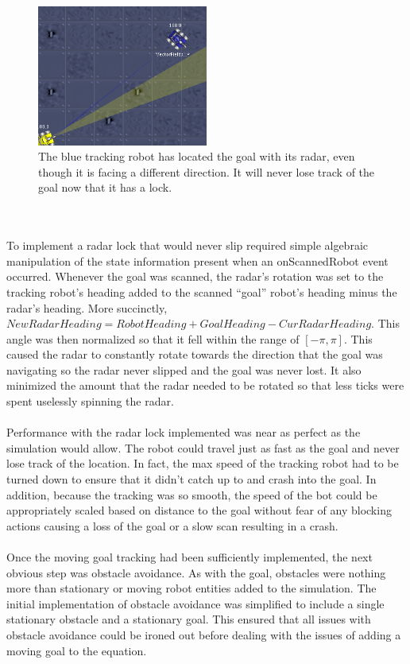 \documentclass{aiaa-tc}%
\begin{document}
\begin{figure}[htb]
\centering
\includegraphics[width=0.5\textwidth]{images/RadarLock}
\caption{The blue tracking robot has located the goal with its radar, even though it is facing a different direction. It will never lose track of the goal now that it has a lock.}
\label{Radar Lock Example}
\end{figure} \\ \\
\noindent
To implement a radar lock that would never slip required simple algebraic manipulation of the state information present when an onScannedRobot event occurred. Whenever the goal was scanned, the radar's rotation was set to the tracking robot's heading added to the scanned ``goal'' robot's heading minus the radar's heading. More succinctly, $NewRadarHeading = RobotHeading + GoalHeading - CurRadarHeading$. This angle was then normalized so that it fell within the range of $[-\pi, \pi]$. This caused the radar to constantly rotate towards the direction that the goal was navigating so the radar never slipped and the goal was never lost. It also minimized the amount that the radar needed to be rotated so that less ticks were spent uselessly spinning the radar. \\ \\
Performance with the radar lock implemented was near as perfect as the simulation would allow. The robot could travel just as fast as the goal and never lose track of the location. In fact, the max speed of the tracking robot had to be turned down to ensure that it didn't catch up to and crash into the goal. In addition, because the tracking was so smooth, the speed of the bot could be appropriately scaled based on distance to the goal without fear of any blocking actions causing a loss of the goal or a slow scan resulting in a crash. \\ \\
Once the moving goal tracking had been sufficiently implemented, the next obvious step was obstacle avoidance. As with the goal, obstacles were nothing more than stationary or moving robot entities added to the simulation. The initial implementation of obstacle avoidance was simplified to include a single stationary obstacle and a stationary goal. This ensured that all issues with obstacle avoidance could be ironed out before dealing with the issues of adding a moving goal to the equation.  \\ \\
\end{document}
